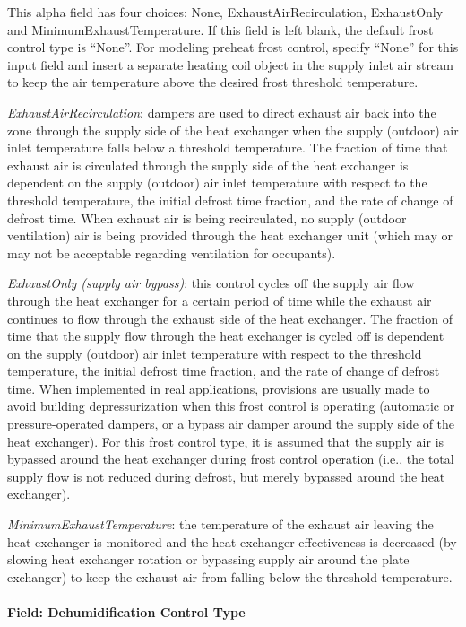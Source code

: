 This alpha field has four choices: None, ExhaustAirRecirculation, ExhaustOnly and MinimumExhaustTemperature. If this field is left blank, the default frost control type is ``None''. For modeling preheat frost control, specify ``None'' for this input field and insert a separate heating coil object in the supply inlet air stream to keep the air temperature above the desired frost threshold temperature.

\emph{ExhaustAirRecirculation}: dampers are used to direct exhaust air back into the zone through the supply side of the heat exchanger when the supply (outdoor) air inlet temperature falls below a threshold temperature. The fraction of time that exhaust air is circulated through the supply side of the heat exchanger is dependent on the supply (outdoor) air inlet temperature with respect to the threshold temperature, the initial defrost time fraction, and the rate of change of defrost time. When exhaust air is being recirculated, no supply (outdoor ventilation) air is being provided through the heat exchanger unit (which may or may not be acceptable regarding ventilation for occupants).

\emph{ExhaustOnly (supply air bypass)}: this control cycles off the supply air flow through the heat exchanger for a certain period of time while the exhaust air continues to flow through the exhaust side of the heat exchanger. The fraction of time that the supply flow through the heat exchanger is cycled off is dependent on the supply (outdoor) air inlet temperature with respect to the threshold temperature, the initial defrost time fraction, and the rate of change of defrost time. When implemented in real applications, provisions are usually made to avoid building depressurization when this frost control is operating (automatic or pressure-operated dampers, or a bypass air damper around the supply side of the heat exchanger). For this frost control type, it is assumed that the supply air is bypassed around the heat exchanger during frost control operation (i.e., the total supply flow is not reduced during defrost, but merely bypassed around the heat exchanger).

\emph{MinimumExhaustTemperature}: the temperature of the exhaust air leaving the heat exchanger is monitored and the heat exchanger effectiveness is decreased (by slowing heat exchanger rotation or bypassing supply air around the plate exchanger) to keep the exhaust air from falling below the threshold temperature.

\paragraph{Field: Dehumidification Control Type}\label{field-dehumidification-control-type-6}

